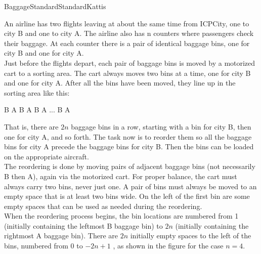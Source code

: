 \begin{problema}{Baggage}{Standard}{Standard}{Kattis} 


An airline has two flights leaving at about the same time from ICPCity, one to city B and one to city A. The airline also has n  counters where passengers check their baggage. At each counter there is a pair of identical baggage bins, one for city B and one for city A. \\

Just before the flights depart, each pair of baggage bins is moved by a motorized cart to a sorting area. The cart always moves two bins at a time, one for city B and one for city A. After all the bins have been moved, they line up in the sorting area like this: \\

\begin{center}
B A B A B A ... B A 
\end{center}

That is, there are $2n$  baggage bins in a row, starting with a bin for city B, then one for city A, and so forth. The task now is to reorder them so all the baggage bins for city A precede the baggage bins for city B. Then the bins can be loaded on the appropriate aircraft. \\

The reordering is done by moving pairs of adjacent baggage bins (not necessarily B then A), again via the motorized cart. For proper balance, the cart must always carry two bins, never just one. A pair of bins must always be moved to an empty space that is at least two bins wide. On the left of the first bin are some empty spaces that can be used as needed during the reordering. \\

When the reordering process begins, the bin locations are numbered from 1  (initially containing the leftmost B baggage bin) to $2n$  (initially containing the rightmost A baggage bin). There are $2n$  initially empty spaces to the left of the bins, numbered from 0  to $-2n+1$ , as shown in the figure for the case $n=4$. \\


\end{problema}
